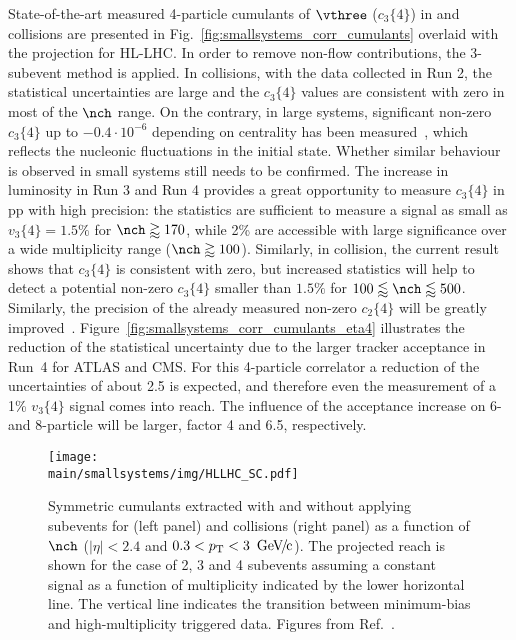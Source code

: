 \documentclass[../report.tex]{subfiles}
\providecommand{\main}{..}
\begin{document}
State-of-the-art measured 4-particle cumulants of $\vthree$ ($c_3\{4\}$) in \pp and \pPb collisions are presented in Fig.~\ref{fig:smallsystems_corr_cumulants} overlaid with the projection for HL-LHC.
In order to remove non-flow contributions, the 3-subevent method is applied. In \pp collisions, with the data collected in Run 2, the statistical uncertainties are large and the $c_3\{4\}$ values are consistent with zero in most of the $\nch$ range. On the contrary, in large systems, significant non-zero $c_3\{4\}$ up to $-0.4 \cdot 10^{-6}$ depending on centrality has been measured~\cite{Aad:2014vba}, which reflects the nucleonic fluctuations in the initial state. Whether similar behaviour is observed in small systems still needs to be confirmed. The increase in luminosity in Run 3 and Run 4 provides a great opportunity to measure $c_3\{4\}$ in pp with high precision: the statistics are sufficient to measure a signal as small as $v_3\{4\} = 1.5\%$ for $\nch \gtrapprox 170$, while 2\% are accessible with large significance over a wide multiplicity range ($\nch \gtrapprox 100$). Similarly, in \pPb collision, the current result shows that $c_3\{4\}$ is consistent with zero, but increased statistics will help to detect a potential non-zero $c_3\{4\}$ smaller than $1.5\%$ for $100 \lessapprox \nch \lessapprox 500$. Similarly, the precision of the already measured non-zero $c_2\{4\}$ will be greatly improved~\cite{ATL-PHYS-PUB-2018-020}.
Figure~\ref{fig:smallsystems_corr_cumulants_eta4} illustrates the reduction of the statistical uncertainty due to the larger tracker acceptance in Run~4 for ATLAS and CMS. For this 4-particle correlator a reduction of the uncertainties of about 2.5 is expected, and therefore even the measurement of a 1\% $v_3\{4\}$ signal comes into reach. The influence of the acceptance increase on 6- and 8-particle will be larger, factor 4 and 6.5, respectively.

\begin{figure}[t!]
\centering
\texttt{[image: \\main/smallsystems/img/HLLHC\_SC.pdf]}
\caption{Symmetric cumulants extracted with and without applying subevents for \pp (left panel) and \pPb collisions (right panel) as a function of $\nch$ ($|\eta| < 2.4$ and $0.3 < \pT < \unit[3]{\UGeVc}$). The projected reach is shown for the case of 2, 3 and 4 subevents assuming a constant signal as a function of multiplicity indicated by the lower horizontal line. The vertical line indicates the transition between minimum-bias and high-multiplicity triggered data. Figures from Ref.~\cite{CMS-PAS-FTR-18-026}.}
\label{fig:smallsystems_corr_symmetriccumulants}
\end{figure}
\end{document}
